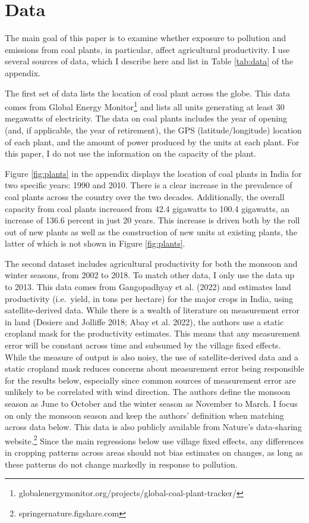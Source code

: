 \documentclass[
]{article}
\begin{document}
\hypertarget{data}{%
\section{Data}\label{data}}

\label{data}

The main goal of this paper is to examine whether exposure to pollution and emissions from coal plants, in particular, affect agricultural productivity. I use several sources of data, which I describe here and list in Table \ref{tab:data} of the appendix.

The first set of data lists the location of coal plant across the globe. This data comes from Global Energy Monitor\footnote{globalenergymonitor.org/projects/global-coal-plant-tracker/} and lists all units generating at least 30 megawatts of electricity. The data on coal plants includes the year of opening (and, if applicable, the year of retirement), the GPS (latitude/longitude) location of each plant, and the amount of power produced by the units at each plant. For this paper, I do not use the information on the capacity of the plant.

Figure \ref{fig:plants} in the appendix displays the location of coal plants in India for two specific years: 1990 and 2010. There is a clear increase in the prevalence of coal plants across the country over the two decades. Additionally, the overall capacity from coal plants increased from 42.4 gigawatts to 100.4 gigawatts, an increase of 136.6 percent in just 20 years. This increase is driven both by the roll out of new plants as well as the construction of new units at existing plants, the latter of which is not shown in Figure \ref{fig:plants}.

The second dataset includes agricultural productivity for both the monsoon and winter seasons, from 2002 to 2018. To match other data, I only use the data up to 2013. This data comes from Gangopadhyay et al. (2022) and estimates land productivity (i.e.~yield, in tons per hectare) for the major crops in India, using satellite-derived data. While there is a wealth of literature on measurement error in land (Desiere and Jolliffe 2018; Abay et al. 2022), the authors use a static cropland mask for the productivity estimates. This means that any measurement error will be constant across time and subsumed by the village fixed effects. While the measure of output is also noisy, the use of satellite-derived data and a static cropland mask reduces concerns about measurement error being responsible for the results below, especially since common sources of measurement error are unlikely to be correlated with wind direction. The authors define the monsoon season as June to October and the winter season as November to March. I focus on only the monsoon season and keep the authors' definition when matching across data below. This data is also publicly available from Nature's data-sharing website.\footnote{springernature.figshare.com} Since the main regressions below use village fixed effects, any differences in cropping patterns across areas should not bias estimates on changes, as long as these patterns do not change markedly in response to pollution.
\end{document}
